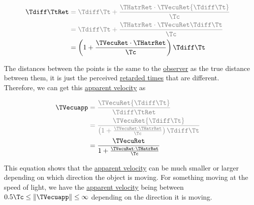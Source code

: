 \begin{equation}
	\begin{aligned}
		\Tdiff \TtRet  & \color{gray} =   \Tdiff \Tt  + \frac{\THatrRet   \cdot \TVecuRet  {\Tdiff \Tt }  }{\Tc }  \\
		         & \color{gray} = \Tdiff \Tt  + \frac{\THatrRet   \cdot \TVecuRet  \Tdiff \Tt }{\Tc }  \\
		         & = \left( 1 + \frac{\TVecuRet  \cdot \THatrRet   }{\Tc } \right) \Tdiff \Tt
	\end{aligned}
\end{equation}

The distances between the points is the same to the \hyperlink{def-observer}{observer} as the true distance between them, it is just the perceived \hyperlink{def-retarded-time}{retarded times} that are different.
Therefore, we can get this \hyperlink{def-apparent-velocity}{apparent velocity} as

\begin{equation}
	\begin{aligned}
		\TVecuapp  & \color{gray}= \frac{\TVecuRet  {\Tdiff \Tt }  }{\Tdiff \TtRet  }                                                                \\
		                    & \color{gray}= \frac{\TVecuRet  {\Tdiff \Tt }  }{\left( 1 + \frac{\TVecuRet  \cdot \THatrRet   }{\Tc } \right) \Tdiff \Tt } \\
		                    & = \frac{\TVecuRet  }{1 + \frac{\TVecuRet  \cdot \THatrRet   }{\Tc } }
	\end{aligned}
\end{equation}

This equation shows that the \hyperlink{def-apparent-velocity}{apparent velocity} can be much smaller or larger depending on which direction the object is moving.
For something moving at the speed of light, we have the \hyperlink{def-apparent-velocity}{apparent velocity} being between $ 0.5 \Tc  \leq \|\TVecuapp \| \leq \infty $ depending on the direction it is moving.

